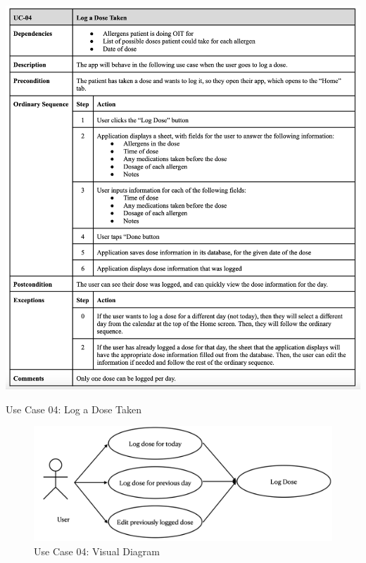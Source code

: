 \begin{table} [H]
    \centering
    \includegraphics[width=1\linewidth]{thesis//chapters//images/uc-04.png}
    \caption{Use Case 04: Log a Dose Taken}
    \label{fig:uc04-table}
\end{table}

\begin{figure} [H]
    \centering
    \includegraphics[width=0.75\linewidth]{thesis//chapters//images/uc-04-visual.png}
    \caption{Use Case 04: Visual Diagram}
    \label{fig:uc04-visual-diagram}
\end{figure}

